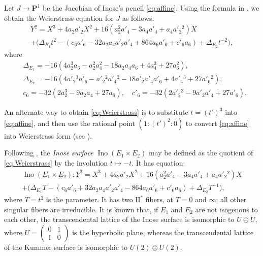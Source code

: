 \documentclass{article}
\newcommand{\adam}[1]{\textcolor{blue}{#1}}
\def\P{\mathbf{P}}
\newcommand{\Ino}{\operatorname{{Ino}}}
\newcommand{\II}{\mathrm{II}}
\begin{document}
Let $J\to\P^1$ be the Jacobian of Inose's pencil \eqref{eq:affine}.  Using the formula in \cite{Artin-et-al:Jacobian}, we obtain the Weierstrass equation for $J$ as follows:
\begin{multline}\label{eq:Weierstrass}
Y^2 = X^3 + 4a_{2} a'_{2} X^2
+ 16(a_{2}^2 a'_{4} - 3 a_{4}a'_{4} + a_{4} a'_{2}{}^2) X
\\
+ \bigl(\Delta_{E_{1}} t^{2} -
(c_{6} a'_{6} - 32 a_{2} a_{4} a'_{2} a'_{4} + 864 a_{6} a'_{6}
+ c'_{6} a_{6} )
+ \Delta_{E_{2}}t^{-2}\bigr),
\end{multline}
where
\begin{align*}
&\Delta_{E_{1}} = -16(4 a_{2}^3 a_{6} - a_{2}^2 a_{4}^2 - 18 a_{2} a_{4} a_{6} + 4 a_{4}^3 + 27 a_{6}^2),\\
&\Delta_{E_{2}} = -16(4 a'_{2}{}^3 a'_{6} - a'_{2}{}^2 a'_{4}{}^2 - 18 a'_{2} a'_{4} a'_{6} + 4 a'_{4}{}^3 + 27 a'_{6}{}^2),
\\
&c_{6} =-32(2 a_{2}^3 - 9 a_{2} a_{4} + 27 a_{6}),\quad
c'_{6} = -32 (2 a'_{2}{}^3 - 9 a'_{2} a'_{4} + 27 a'_{6}).
\end{align*}

An alternate way to obtain \eqref{eq:Weierstrass} is to substitute $t=(t')^3$ into \eqref{eq:affine}, and then use the rational point $(1:(t')^2:0)$ to convert \eqref{eq:affine} into Weierstrass form (see \cite[\S2.1]{Kumar-Kuwata:Rk18}).

Following \cite{Kumar-Kuwata:Rk18}, the {\em Inose surface} $\Ino(E_{1}\times E_{2})$ may be defined as the quotient of \eqref{eq:Weierstrass} by the involution $t\mapsto -t$.  It has equation:
\begin{multline}\label{eq:Inose}
\Ino(E_{1}\times E_{2}): Y^2 = X^3 + 4a_{2} a'_{2}  X^2
+ 16(a_{2}^2 a'_{4} - 3 a_{4}a'_{4} + a_{4} a'_{2}{}^2)  X
\\
+ \bigl(\Delta_{E_{1}} T -
(c_{6} a'_{6} + 32 a_{2} a_{4} a'_{2} a'_{4} - 864 a_{6} a'_{6}
+ c'_{6} a_{6} )
+ \Delta_{E_{2}}T^{-1}\bigr),
\end{multline}
where $T=t^{2}$ is the parameter.  
It has two $\II^{*}$ fibers, at $T=0$ and $\infty$;  all other singular fibers are irreducible.  It is known that, if $E_{1}$ and $E_{2}$ are not isogenous to each other, the transcendental lattice of the Inose surface is isomorphic to $U\oplus U$, where $U=\left(\begin{smallmatrix}0 & 1 \\ 1 & 0\end{smallmatrix}\right)$ is the hyperbolic plane, whereas the transcendental lattice of the Kummer surface is isomorphic to $U(2)\oplus U(2)$.
\end{document}
